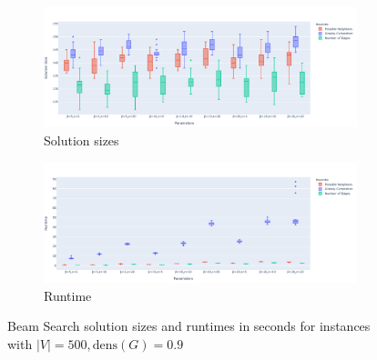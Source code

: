 \documentclass[draft,final]{vutinfth} %
\begin{document}
\begin{figure}
    \centering
    \begin{subfigure}{\textwidth}
        \centering
        \includegraphics[width=\textwidth]{graphics/lbh-09-500-size.pdf}
        \caption{Solution sizes}
    \end{subfigure}
    \begin{subfigure}{\textwidth}
        \centering
        \includegraphics[width=\textwidth]{graphics/lbh-09-500-runtime.pdf}
        \caption{Runtime}
    \end{subfigure}
    \caption{Beam Search solution sizes and runtimes in seconds for instances with $|V|=500, \mathrm{dens}(G)=0.9$}
    \label{fig:bs-heuristics-random-2}
\end{figure}
\end{document}
